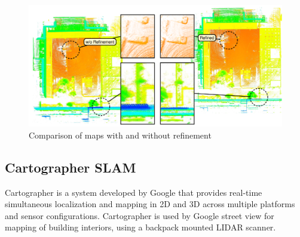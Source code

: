 \begin{figure}[!ht]
    \centering
    \includegraphics[width=150mm, keepaspectratio]{figures/3d_slam_example.png}
    \caption{Comparison of maps with and without refinement\cite{droeschel2018efficient}} 
    \label{fig:3d_lidar_mapping_example}
\end{figure}


\subsection{Cartographer SLAM}
Cartographer is a system developed by Google that provides real-time simultaneous localization and mapping
in 2D and 3D across multiple platforms and sensor configurations. Cartographer is used by Google street view
for mapping of building interiors, using a backpack mounted LIDAR scanner.

